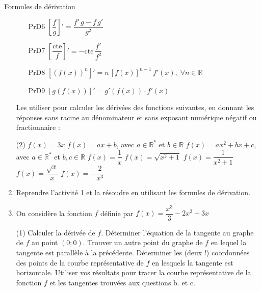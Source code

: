 \documentclass[a4paper,12pt]{article}
\begin{document}
\begin{activite}{Formules de dérivation}
\begin{enumerate}
\begin{multicols}{2}
\begin{itemize}
      \item [PrD6] \(\left[\dfrac{f}{g}\right]'=\dfrac{f'\,g - f\,g'}{g^2}\)
      \item [PrD7] \(\left[\dfrac{\mathrm{cte}}{f}\right]'=-\mathrm{cte}\,\dfrac{f'}{f^2}\)
      \item [PrD8] \(\left[(f(x))^n\right]'=n\,[f(x)]^{n-1}\,f'(x),\;\forall n\in\mathbb{R}\)
      \item [PrD9] \(\left[g(f(x))\right]'=g'(f(x))\cdot f'(x)\)
    \end{itemize}
	  \end{multicols}
  Les utiliser pour calculer les dérivées des fonctions suivantes, en donnant les réponses sans racine au dénominateur et sans exposant numérique négatif ou fractionnaire :
    \begin{tasks}(2)
      \task \(f(x)=3x\)
      \task \(f(x)=ax+b\), avec \(a\in\mathbb{R}^*\) et \(b\in\mathbb{R}\)
      \task \(f(x)=ax^2+bx+c\), avec \(a\in\mathbb{R}^*\) et \(b,c\in\mathbb{R}\)
      \task \(f(x)=\dfrac{1}{x}\)
      \task \(f(x)=\sqrt{x^2+1}\)
      \task \(f(x)=\dfrac{1}{x^2+1}\)
      \task \(f(x)=\dfrac{\sqrt{x}}{x}\)
      \task \(f(x)=-\dfrac{2}{x^3}\)
    \end{tasks}
  \item Reprendre l’activité 1 et la résoudre en utilisant les formules de dérivation.
  \item On considère la fonction $f$ définie par \(f(x)=\dfrac{x^3}{3}-2x^2+3x\)
\begin{tasks}(1)
  \task Calculer la dérivée de \(f\).
  \task Déterminer l’équation de la tangente au graphe de \(f\) au point \((0;0)\).
  \task Trouver un autre point du graphe de \(f\) en lequel la tangente est parallèle à la précédente.
  \task Déterminer les (deux !) coordonnées des points de la courbe représentative de \(f\) en lesquels la tangente est horizontale.
  \task Utiliser vos résultats pour tracer la courbe représentative de la fonction \(f\) et les tangentes trouvées aux questions b. et c.
\end{tasks}
\end{enumerate}
\end{activite}
\end{document}
